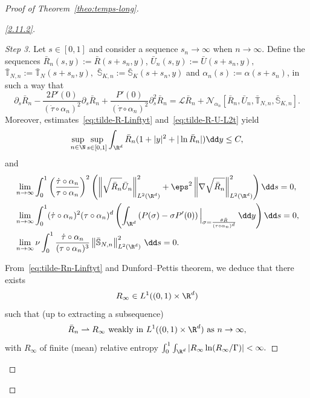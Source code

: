 \begin{proof}[Proof of Theorem~\ref{theo:temps-long}]
\begin{proof}[\eqref{2.11.2}]
\goodbreak
\begin{proof}[Step 3]
Let $s \in [0,1]$ and consider a sequence $s_n \to \infty$ when $n \to
\infty$. Define the sequences $\bar R_n(s,y) := \bar R(s+s_n,y)$, $\bar U_n(s,y) := \bar U (s+s_n,y),$ $\bar{\mathbb T}_{N,n} := \bar{\mathbb T}_{N}(s+s_n,y),$ $\bar{\mathbb S}_{K,n} := \bar{\mathbb S}_{K}(s+s_n,y)$ and $\alpha_n(s) := \alpha (s + s_n)$, in such a way that
\begin{equation}\label{eq:tilde-Rn-Un}
\partial_s \bar R_n - \frac{2P'(0)}{(\dot \tau\circ
\alpha_n)^2}\partial_s \bar R_n + \frac{P'(0)}{(\dot \tau\circ
\alpha_n)^2}\partial_s^2 \bar R_n = \mathcal L \bar R_n + \mathcal N_{\alpha_n} [\bar R_n,\bar U_n, \bar{\mathbb T}_{N,n}, \bar{\mathbb S}_{K,n}].
\end{equation}
Moreover, estimates~\eqref{eq:tilde-R-Linftyt} and~\eqref{eq:tilde-R-U-L2t} yield
\begin{equation}\label{eq:tilde-Rn-Linftyt}
\sup_{n \in \N} \sup_{s \in [0,1]} \int_{\R^d} \bar R_n (1+|y|^2 + |\ln \bar R_n|) \dd y
\le C,
\end{equation}
and
\begin{equation}\label{eq:tilde-Rn-Un-L2t}
\begin{aligned}
& \lim_{n \to \infty}
\int_0^1 \left(\frac{\dot \tau\circ \alpha_n}{\tau\circ \alpha_n}
\right)^2 \left(\left\| \sqrt{\bar R_n} \bar U_n \right\|_{L^2(\R^d)}^2 + \eps^2 \left\| \nabla \sqrt{\bar R_n} \right\|_{L^2(\R^d)}^2 \right) \dd s =0, \\
&\lim_{n \to \infty} \int_0^1 (\dot \tau\circ \alpha_n)^2 (\tau\circ \alpha_n)^{d}
\left(\int_{\R^d} \left(P(\sigma) - \sigma P'(0) \right)\Big|_{\sigma = \frac{\theta
\bar R}{(\tau \circ \alpha_n)^d} } \, \dd y \right) \dd s =0, \\
& \lim_{n \to \infty} \nu \int_0^1 \frac{\dot \tau \circ \alpha_n}{(\tau \circ
\alpha_n)^3} \left\| \bar{\mathbb S}_{N,n} \right\|_{L^2(\R^d)}^2 \, \dd s = 0.
\end{aligned}
\end{equation}

From~\eqref{eq:tilde-Rn-Linftyt} and Dunford--Pettis theorem, we deduce that there exists
\[
R_\infty \in L^1((0,1) \times \R^d)
\]
such that (up to extracting a subsequence)
\[
\bar R_n \rightharpoonup R_\infty \text{ weakly in } L^1((0,1) \times \R^d) \text{ as } n \to \infty,
\]
with $R_{\infty}$ of finite (mean) relative entropy $\int_0^1
\int_{\R^d} |{R}_{\infty}\ln ({R}_{\infty}/\Gamma)| < \infty.$


\end{proof}
\end{proof}
\end{proof}
